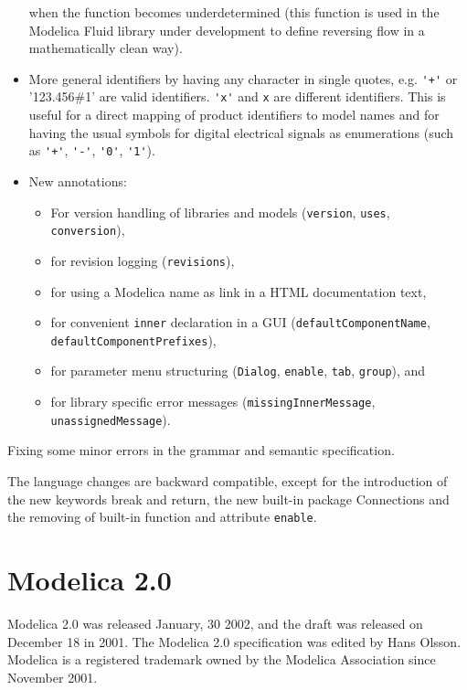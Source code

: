 \begin{itemize}
  when the function becomes underdetermined (this function is used in
  the Modelica Fluid library under development to define reversing flow
  in a mathematically clean way).
\item
  More general identifiers by having any character in single quotes,
  e.g. \lstinline!'+'! or '123.456\#1' are valid identifiers. \lstinline!'x'! and \lstinline!x! are
  different identifiers. This is useful for a direct mapping of product
  identifiers to model names and for having the usual symbols for
  digital electrical signals as enumerations (such as \lstinline!'+'!, \lstinline!'-'!, \lstinline!'0'!,
  \lstinline!'1'!).
\item
  New annotations:
\begin{itemize}
\item For version handling of libraries and models (\lstinline!version!, \lstinline!uses!,
\lstinline!conversion!),
\item for revision logging (\lstinline!revisions!),
\item for using a Modelica name as link in a HTML documentation text,
\item for convenient \lstinline!inner! declaration in a GUI (\lstinline!defaultComponentName!,
\lstinline!defaultComponentPrefixes!),
\item for parameter menu structuring (\lstinline!Dialog!, \lstinline!enable!, \lstinline!tab!,
\lstinline!group!), and
\item for library specific error messages (\lstinline!missingInnerMessage!,
\lstinline!unassignedMessage!).
\end{itemize}
\end{itemize}
Fixing some minor errors in the grammar and semantic specification.

The language changes are backward compatible, except for the
introduction of the new keywords break and return, the new built-in
package Connections and the removing of built-in function and attribute
\lstinline!enable!.

\section{Modelica 2.0}

Modelica 2.0 was released January, 30 2002, and the draft was released
on December 18 in 2001. The Modelica 2.0 specification was edited by
Hans Olsson. Modelica is a registered trademark owned by the Modelica
Association since November 2001.

